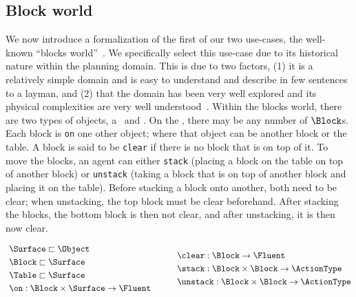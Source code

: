 \subsection{Block world}

We now introduce a formalization of the first of our two use-cases, the
well-known ``blocks world''~\cite{nilsson_principles_1982}. We specifically select
this use-case due to its historical nature within the planning domain.
This is due to two factors, (1) it is a relatively simple domain and is
easy to understand and describe in few sentences to a layman, and
(2) that the domain has been very well explored and its physical
complexities are very well
understood~\cite{gupta_complexity_1992,slaney_blocks_2001}. Within the
blocks world, there are two types of objects, a \Table\ and \Block.
On the \Table, there may be any number of $\Block$s.  Each block is
\texttt{on} one other object; where that object can be another block or the
table. A block is said to be \texttt{clear} if there is no block that
is on top of it. To move the blocks, an agent can either
\texttt{stack} (placing a block on the table on top of another block)
or \texttt{unstack} (taking a block that is on top of another block
and placing it on the table). Before stacking a block onto another, both need
to be clear; when unstacking, the top block must be clear beforehand.
After stacking the blocks, the bottom block is then not clear, and
after unstacking, it is then now clear.

\vspace{-0.03in}
  \begin{equation*}
    \begin{aligned}\
      &\Surface \sqsubset \Object \\
      &\Block \sqsubset \Surface \\
      &\Table \sqsubset \Surface \\
      &\on: \Block \times \Surface \rightarrow \Fluent
             \end{aligned} \hspace{30pt}
 \begin{aligned}
      &\clear: \Block \rightarrow \Fluent \\
      &\stack: \Block \times \Block \rightarrow \ActionType \\
      &\unstack: \Block \times \Block \rightarrow \ActionType
    \end{aligned}
  \end{equation*}
